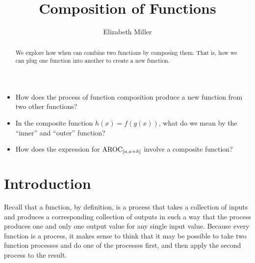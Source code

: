 \documentclass{ximera}
\author{Elizabeth Miller}
\title{Composition of Functions}
\begin{document}
\begin{abstract}
  We explore how when can combine two functions by composing them.  That is, how we can plug one function into another to create a new function.
\end{abstract}
\maketitle



\begin{motivatingQuestions}\begin{itemize}
\item How does the process of function composition produce a new function from two other functions?
\item In the composite function $h(x) = f(g(x))$, what do we mean by the ``inner'' and ``outer'' function?  
\item How does the expression for $\mathrm{AROC}_{[a,a+h]}$ involve a composite function?
\end{itemize}\end{motivatingQuestions}



\section{Introduction}
Recall that a function, by definition, is a process that takes a collection of inputs and produces a corresponding collection of outputs in such a way that the process produces one and only one output value for any single input value.  Because every function is a process, it makes sense to think that it may be possible to take two function processes and do one of the processes first, and then apply the second process to the result.
\end{document}
